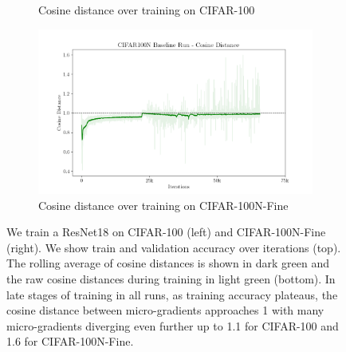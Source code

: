 \begin{figure}[t!]
\begin{subfigure}{0.495\linewidth}
    \caption{Cosine distance over training on CIFAR-100}
    \label{fig:cosdist_cifar100}
  \end{subfigure}
  \hfill
  \begin{subfigure}{0.495\linewidth}
    \includegraphics[width=\linewidth,  trim=0 0 0 17mm, clip]{figures/figure_1_4_Baseline_Run_CIFAR100N_cosine_distance.png}
    \caption{Cosine distance over training on CIFAR-100N-Fine}
    \label{fig:costdist_cifar100n}
  \end{subfigure}
  \caption{We train a ResNet18 on CIFAR-100 (left) and CIFAR-100N-Fine (right). We show train and validation accuracy  over iterations (top). The rolling average of cosine distances is shown in dark green and the raw cosine distances during training in light green (bottom). In late stages of training in all runs, as training accuracy plateaus, the cosine distance between micro-gradients approaches 1 with many micro-gradients diverging even further up to 1.1 for CIFAR-100 and 1.6 for CIFAR-100N-Fine. }
  \label{fig:val_cosd_cifar}
\end{figure}

